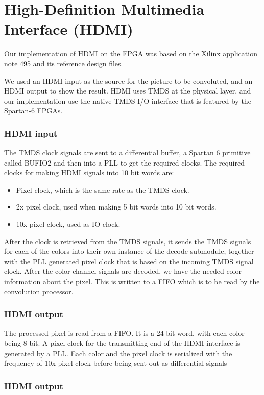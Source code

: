 \section{High-Definition Multimedia Interface (HDMI)}
Our implementation of HDMI on the FPGA was based on the Xilinx application note 495\cite{xapp495} and its reference design files.

We used an HDMI input as the source for the picture to be convoluted, and an HDMI output to show the result.
HDMI uses TMDS at the physical layer, and our implementation use the native TMDS I/O interface that is featured by the Spartan-6 FPGAs.

\subsubsection{HDMI input}
The TMDS clock signals are sent to a differential buffer, a Spartan 6 primitive called BUFIO2 and then into a PLL to get the required clocks. The required clocks for making HDMI signals into 10 bit words are:
\begin{itemize}
    \item   Pixel clock, which is the same rate as the TMDS clock.
    \item   2x pixel clock, used when making 5 bit words into 10 bit words.
    \item   10x pixel clock, used as IO clock.
\end{itemize}

After the clock is retrieved from the TMDS signals, it sends the TMDS signals for each of the colors into their own instance of the decode submodule, together with the PLL generated pixel clock that is based on the incoming TMDS signal clock. After the color channel signals are decoded, we have the needed color information about the pixel. This is written to a FIFO which is to be read by the convolution processor.


\subsubsection{HDMI output}

The processed pixel is read from a FIFO. It is a 24-bit word, with each color being 8 bit. A pixel clock for the transmitting end of the HDMI interface is generated by a PLL. Each color  and the pixel clock is serialized with the frequency of 10x pixel clock before being sent out as differential signals
\subsubsection{HDMI output}
